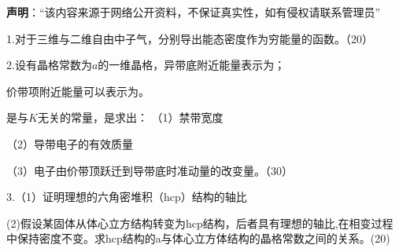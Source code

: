 
\textbf{声明}：“该内容来源于网络公开资料，不保证真实性，如有侵权请联系管理员”

1.对于三维与二维自由中子气，分别导出能态密度作为穷能量的函数。（20）

2.设有晶格常数为$a$的一维晶格，异带底附近能量表示为；

价带项附近能量可以表示为。

是与$K$无关的常量，是求出：
（1）禁带宽度

（2）导带电子的有效质量

（3）电子由价带顶跃迁到导带底时准动量的改变量。（30）

3.（1）证明理想的六角密堆积（hcp）结构的轴比

(2)假设某固体从体心立方结构转变为hcp结构，后者具有理想的轴比,在相变过程中保持密度不变。求hcp结构的a与体心立方体结构的晶格常数之间的关系。(20)











